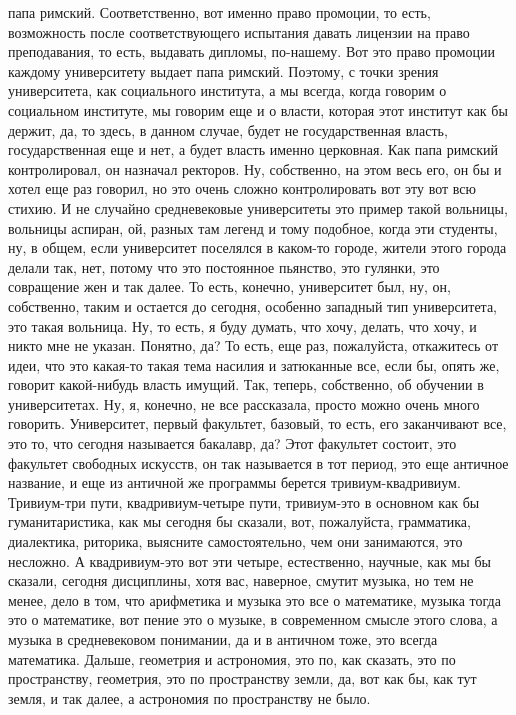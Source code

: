 папа римский. Соответственно, вот именно право промоции, то есть, возможность
после соответствующего испытания давать лицензии на право преподавания, то есть,
выдавать дипломы, по-нашему. Вот это право промоции каждому университету выдает
папа римский. Поэтому, с точки зрения университета, как социального института, а
мы всегда, когда говорим о социальном институте, мы говорим еще и о власти,
которая этот институт как бы держит, да, то здесь, в данном случае, будет не
государственная власть, государственная еще и нет, а будет власть именно
церковная. Как папа римский контролировал, он назначал ректоров. Ну, собственно,
на этом весь его, он бы и хотел еще раз говорил, но это очень сложно
контролировать вот эту вот всю стихию. И не случайно средневековые университеты
это пример такой вольницы, вольницы аспиран, ой, разных там легенд и тому
подобное, когда эти студенты, ну, в общем, если университет поселялся в каком-то
городе, жители этого города делали так, нет, потому что это постоянное пьянство,
это гулянки, это совращение жен и так далее. То есть, конечно, университет был,
ну, он, собственно, таким и остается до сегодня, особенно западный тип
университета, это такая вольница. Ну, то есть, я буду думать, что хочу, делать,
что хочу, и никто мне не указан. Понятно, да? То есть, еще раз, пожалуйста,
откажитесь от идеи, что это какая-то такая тема насилия и затюканные все, если
бы, опять же, говорит какой-нибудь власть имущий. Так, теперь, собственно, об
обучении в университетах. Ну, я, конечно, не все рассказала, просто можно очень
много говорить. Университет, первый факультет, базовый, то есть, его заканчивают
все, это то, что сегодня называется бакалавр, да? Этот факультет состоит, это
факультет свободных искусств, он так называется в тот период, это еще античное
название, и еще из античной же программы берется тривиум-квадривиум. Тривиум-три
пути, квадривиум-четыре пути, тривиум-это в основном как бы гуманитаристика, как
мы сегодня бы сказали, вот, пожалуйста, грамматика, диалектика, риторика,
выясните самостоятельно, чем они занимаются, это несложно. А квадривиум-это вот
эти четыре, естественно, научные, как мы бы сказали, сегодня дисциплины, хотя
вас, наверное, смутит музыка, но тем не менее, дело в том, что арифметика и
музыка это все о математике, музыка тогда это о математике, вот пение это о
музыке, в современном смысле этого слова, а музыка в средневековом понимании, да
и в античном тоже, это всегда математика. Дальше, геометрия и астрономия, это
по, как сказать, это по пространству, геометрия, это по пространству земли, да,
вот как бы, как тут земля, и так далее, а астрономия по пространству не было.
